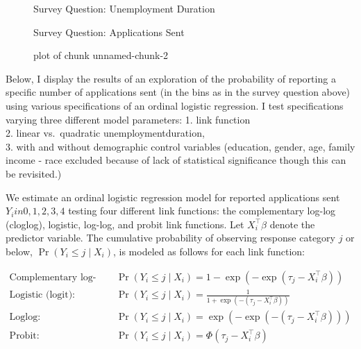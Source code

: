 \begin{figure}
\centering
{}
\caption{Survey Question: Unemployment Duration}
\end{figure}

\begin{figure}
\centering
{}
\caption{Survey Question: Applications Sent}
\end{figure}

\begin{figure}
\centering
{}
\caption{plot of chunk unnamed-chunk-2}
\end{figure}

Below, I display the results of an exploration of the probability of
reporting a specific number of applications sent (in the bins as in the
survey question above) using various specifications of an ordinal
logistic regression. I test specifications varying three different model
parameters: 1. link function\\
2. linear vs.~quadratic unemploymentduration,\\
3. with and without demographic control variables (education, gender,
age, family income - race excluded because of lack of statistical
significance though this can be revisited.)

We estimate an ordinal logistic regression model for reported
applications sent \(Y_i in {0, 1, 2, 3, 4}\) testing four different link
functions: the complementary log-log (cloglog), logistic, log-log, and
probit link functions. Let \(X_i^\top \beta\) denote the predictor
variable. The cumulative probability of observing response category
\(j\) or below, \(\Pr(Y_i \leq j \mid X_i)\), is modeled as follows for
each link function:

\begin{align*}
\text{Complementary log-log (cloglog):} \quad & \Pr(Y_i \leq j \mid X_i) = 1 - \exp\left( -\exp\left( \tau_j - X_i^\top \beta \right) \right) \\
\text{Logistic (logit):} \quad & \Pr(Y_i \leq j \mid X_i) = \frac{1}{1 + \exp\left( -(\tau_j - X_i^\top \beta) \right)} \\
\text{Loglog:} \quad & \Pr(Y_i \leq j \mid X_i) = \exp\left( -\exp\left( -(\tau_j - X_i^\top \beta) \right) \right) \\
\text{Probit:} \quad & \Pr(Y_i \leq j \mid X_i) = \Phi(\tau_j - X_i^\top \beta)
\end{align*}

